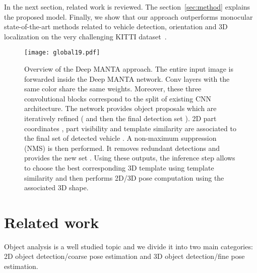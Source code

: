 \documentclass[10pt,twocolumn,letterpaper]{article}
\begin{document}
In the next section, related work is reviewed. The section~\ref{sec:method} explains the proposed model. Finally, we show that our approach outperforms monocular state-of-the-art methods related to vehicle detection, orientation and 3D localization on the very challenging KITTI dataset~\cite{kitti}.

\begin{figure*}[ht]
\texttt{[image: global19.pdf]}
\centering
\vspace{1mm}
\caption{Overview of the Deep MANTA approach. The entire input image is forwarded inside the Deep MANTA network. Conv layers with the same color share the same weights. Moreover, these three convolutional blocks correspond to the split of existing CNN architecture. The network provides object proposals  which are iteratively refined ( and then the final detection set ). 2D part coordinates , part visibility  and template similarity  are associated to the final set of detected vehicle . A non-maximum suppression (NMS) is then performed. It removes redundant detections and provides the new set . Using these outputs, the inference step allows to choose the best corresponding 3D template using template similarity  and then performs 2D/3D pose computation using the associated 3D shape.}
\label{fig:shapercnn}


\end{figure*}


\section{Related work}
\label{sec:rw}

Object analysis is a well studied topic and we divide it into two main categories: 2D object detection/coarse pose estimation and 3D object detection/fine pose estimation.
\end{document}
